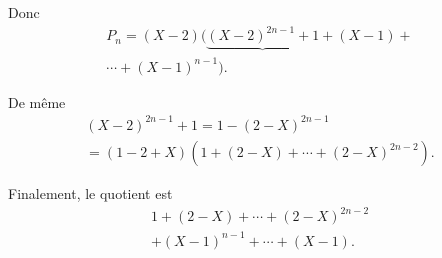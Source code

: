 \begin{itemize}
Donc
\begin{multline*}
  P_n = (X-2)( \underbrace{(X-2)^{2n-1} +1} + (X-1) + \\
  \cdots + (X-1)^{n-1}).
\end{multline*}

De même
\begin{multline*}
  (X-2)^{2n-1} +1 = 1 - (2-X)^{2n-1} \\
  = (1-2 + X)\left(1 + (2-X) + \cdots +(2-X)^{2n-2}\right).
\end{multline*}

Finalement, le quotient est
\begin{multline*}
  1 + (2-X) + \cdots +(2-X)^{2n-2} \\
  + (X-1)^{n-1} +  \cdots + (X-1) .
\end{multline*}

\end{itemize}


